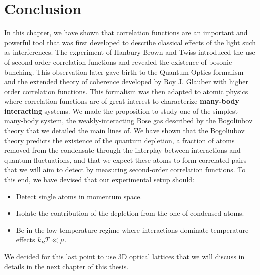 \section{Conclusion}

In this chapter, we have shown that correlation functions are an important and powerful tool that was first developed to describe classical effects of the light such as interferences. The experiment of Hanbury Brown and Twiss introduced the use of second-order correlation functions and revealed the existence of bosonic bunching. This observation later gave birth to the Quantum Optics formalism and the extended theory of coherence developed by Roy J. Glauber with higher order correlation functions. This formalism was then adapted to atomic physics where correlation functions are of great interest to characterize \textbf{many-body interacting} systems. We made the proposition to study one of the simplest many-body system, the weakly-interacting Bose gas described by the Bogoliubov theory that we detailed the main lines of. We have shown that the Bogoliubov theory predicts the existence of the quantum depletion, a fraction of atoms removed from the condensate through the interplay between interactions and quantum fluctuations, and that we expect these atoms to form \kmk correlated pairs that we will aim to detect by measuring second-order correlation functions. To this end, we have devised that our experimental setup should:

\begin{itemize}
    \item Detect single atoms in momentum space.
    \item Isolate the contribution of the depletion from the one of condensed atoms.
    \item Be in the low-temperature regime where interactions dominate temperature effects $k_B T \ll \mu $. 
\end{itemize}

We decided for this last point to use 3D optical lattices that we will discuss in details in the next chapter of this thesis.